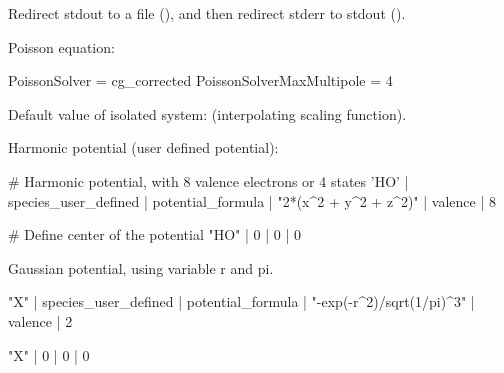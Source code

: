 Redirect stdout to a file (), and then redirect stderr to stdout
().

Poisson equation:
\begin{textcode}
PoissonSolver = cg_corrected
PoissonSolverMaxMultipole = 4
\end{textcode}
Default value of isolated system:  (interpolating scaling function).

Harmonic potential (user defined potential):
\begin{textcode}
# Harmonic potential, with 8 valence electrons or 4 states
  'HO' | species_user_defined | potential_formula | "2*(x^2 + y^2 + z^2)" | valence | 8
%

# Define center of the potential
  "HO" | 0 | 0 | 0
%
\end{textcode}


Gaussian potential, using variable r and pi.
\begin{textcode}
  "X" | species_user_defined | potential_formula | "-exp(-r^2)/sqrt(1/pi)^3" | valence | 2
%

  "X" | 0 | 0 | 0
%
\end{textcode}